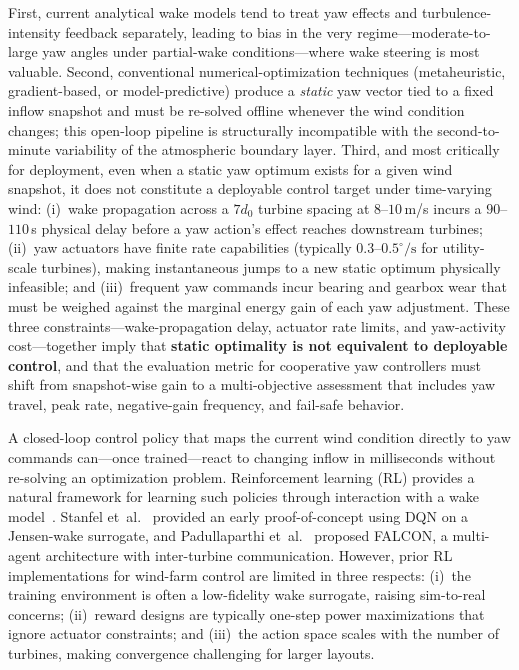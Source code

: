 \documentclass[final,5p,times]{elsarticle}
\begin{document}
First, current analytical wake models tend to treat yaw effects and turbulence-intensity feedback separately, leading to bias in the very regime---moderate-to-large yaw angles under partial-wake conditions---where wake steering is most valuable. Second, conventional numerical-optimization techniques (metaheuristic, gradient-based, or model-predictive) produce a \emph{static} yaw vector tied to a fixed inflow snapshot and must be re-solved offline whenever the wind condition changes; this open-loop pipeline is structurally incompatible with the second-to-minute variability of the atmospheric boundary layer. Third, and most critically for deployment, even when a static yaw optimum exists for a given wind snapshot, it does not constitute a deployable control target under time-varying wind: (i)~wake propagation across a $7d_0$ turbine spacing at $8$--$10$\,m/s incurs a $90$--$110$\,s physical delay before a yaw action's effect reaches downstream turbines; (ii)~yaw actuators have finite rate capabilities (typically $0.3$--$0.5^\circ\!/\!\mathrm{s}$ for utility-scale turbines), making instantaneous jumps to a new static optimum physically infeasible; and (iii)~frequent yaw commands incur bearing and gearbox wear that must be weighed against the marginal energy gain of each yaw adjustment. These three constraints---wake-propagation delay, actuator rate limits, and yaw-activity cost---together imply that \textbf{static optimality is not equivalent to deployable control}, and that the evaluation metric for cooperative yaw controllers must shift from snapshot-wise gain to a multi-objective assessment that includes yaw travel, peak rate, negative-gain frequency, and fail-safe behavior.

A closed-loop control policy that maps the current wind condition directly to yaw commands can---once trained---react to changing inflow in milliseconds without re-solving an optimization problem. Reinforcement learning (RL) provides a natural framework for learning such policies through interaction with a wake model~\citep{Padullaparthi2022}. Stanfel et~al.~\citep{Stanfel2020} provided an early proof-of-concept using DQN on a Jensen-wake surrogate, and Padullaparthi et~al.~\citep{Padullaparthi2022} proposed FALCON, a multi-agent architecture with inter-turbine communication. However, prior RL implementations for wind-farm control are limited in three respects: (i)~the training environment is often a low-fidelity wake surrogate, raising sim-to-real concerns; (ii)~reward designs are typically one-step power maximizations that ignore actuator constraints; and (iii)~the action space scales with the number of turbines, making convergence challenging for larger layouts.
\end{document}
